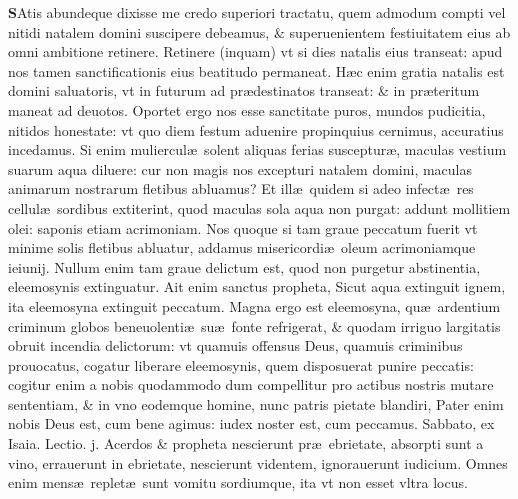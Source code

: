 \documentclass[a5paper,10pt]{book}
\def\leftmarginnote{%
	\lrmarginnote{\hskip -\marginparsep \hskip -6.5em}}
\def\ae{æ}
\begin{document}
\begin{multicols*}{2}
\vspace{-.25em}
\lettrine[lines=2]{\bfseries \color{red} S}{}Atis abundeque dixisse me credo superiori tractatu, quem admodum compti vel nitidi natalem domini suscipere debeamus, \& superuenientem festiuitatem eius ab omni ambitione retinere.
Retinere (inquam) vt si dies natalis eius transeat: apud nos tamen sanctificationis eius beatitudo permaneat.
H\ae c enim gratia natalis est domini saluatoris, vt in futurum ad pr\ae destinatos transeat: \& in pr\ae teritum maneat ad deuotos.
Oportet ergo nos esse sanctitate puros, mundos pudicitia, nitidos honestate: vt quo diem festum aduenire propinquius cernimus, accuratius incedamus.
Si enim muliercul\ae \ solent aliquas ferias susceptur\ae , maculas vestium suarum aqua diluere: cur non magis nos excepturi natalem domini, maculas animarum nostrarum fletibus abluamus?
Et ill\ae \ quidem si adeo infect\ae \ res cellul\ae \ sordibus extiterint, quod maculas sola aqua non purgat:
addunt mollitiem olei: saponis etiam acrimoniam.
Nos quoque si tam graue peccatum fuerit vt minime solis fletibus abluatur, addamus misericordi\ae \ oleum acrimoniamque ieiunij.
Nullum enim tam graue delictum est, quod non purgetur abstinentia, eleemosynis extinguatur.
Ait enim sanctus propheta, Sicut aqua extinguit ignem, ita eleemosyna extinguit peccatum.
Magna ergo est eleemosyna, qu\ae \ ardentium criminum globos beneuolenti\ae \ su\ae \ fonte refrigerat, \& quodam irriguo largitatis obruit incendia delictorum: vt quamuis offensus Deus, quamuis criminibus prouocatus, cogatur liberare eleemosynis, quem disposuerat punire peccatis: cogitur enim a nobis quodammodo dum compellitur pro actibus nostris mutare sententiam, \& in vno eodemque homine, nunc patris pietate blandiri, Pater enim nobis Deus est, cum bene agimus: iudex noster est, cum peccamus.
\newline {} \color{red} \hypertarget{SAT-PRIMA-ADV}{Sabbato,} ex Isaia. \hfill Lectio. j. \color{black}
\vspace{-.5em}
Acerdos\leftmarginnote{\begin{flushright}c. 28.\end{flushright}} \& propheta nescierunt pr\ae \ ebrietate, absorpti sunt a vino, errauerunt in ebrietate, nescierunt videntem, ignorauerunt iudicium.
Omnes enim mens\ae \ replet\ae \ sunt vomitu sordiumque, ita vt non esset vltra locus.

\end{multicols*}
\end{document}
